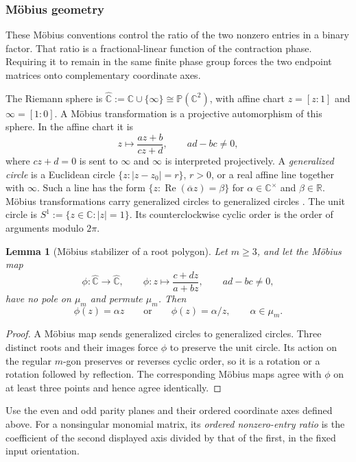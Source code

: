\documentclass[11pt,letterpaper,onecolumn]{article}
\theoremstyle{plain}
\newtheorem{lemma}[lemma]{Lemma}
\theoremstyle{definition}
\theoremstyle{remark}
\begin{document}
\subsubsection{Möbius geometry}
\label{subsubsec:mobius-geometry}

These M\"obius conventions control the
ratio of the two nonzero entries in a binary factor.  That ratio is a
fractional-linear function of the contraction phase.  Requiring it to
remain in the same finite phase group forces the two endpoint matrices
onto complementary coordinate axes.

The Riemann sphere is
\(\widehat{\mathbb C}:=\mathbb C\cup\{\infty\}\cong\mathbb P(\mathbb C^2)\),
with affine chart \(z=[z:1]\) and \(\infty=[1:0]\).  A Möbius transformation
is a projective automorphism of this sphere. In the affine chart it is
\[
 z\longmapsto\frac{az+b}{cz+d},
 \qquad ad-bc\ne0,
\]
where \(cz+d=0\) is sent to \(\infty\) and \(\infty\) is interpreted
projectively.  A \emph{generalized circle} is a Euclidean circle
\(\{z:|z-z_0|=r\}\), \(r>0\), or a real affine line together with
\(\infty\). Such a line has the form
\(\{z:\operatorname{Re}(\overline\alpha z)=\beta\}\) for
\(\alpha\in\mathbb C^\times\) and \(\beta\in\mathbb R\).
Möbius transformations carry generalized circles to
generalized circles \cite[Chapter~3]{Beardon1983}.  The unit circle is
\(S^1:=\{z\in\mathbb C:|z|=1\}\). Its counterclockwise cyclic order is the
order of arguments modulo \(2\pi\).


\begin{lemma}[M\"obius stabilizer of a root polygon]
\label{lem:nd-root-mobius}
Let \(m\ge3\), and let the M\"obius map
\[
 \phi:\widehat{\mathbb C}\longrightarrow\widehat{\mathbb C},
 \qquad
 \phi:z\longmapsto\frac{c+dz}{a+bz},
 \qquad ad-bc\ne0,
\]
have no pole on \(\mu_m\) and permute \(\mu_m\).  Then
\[
 \phi(z)=\alpha z
 \qquad\text{or}\qquad
 \phi(z)=\alpha/z,
 \qquad \alpha\in\mu_m.
\]
\end{lemma}

\begin{proof}
A M\"obius map sends generalized circles to generalized circles.  Three
distinct roots and their images force \(\phi\) to preserve the unit circle.
Its action on the regular \(m\)-gon preserves or reverses cyclic order, so it
is a rotation or a rotation followed by reflection.  The corresponding
M\"obius maps agree with \(\phi\) on at least three points and hence agree
identically.
\end{proof}

Use the even and odd parity planes and their ordered coordinate axes
defined above.  For a nonsingular
monomial matrix, its \emph{ordered nonzero-entry ratio} is the coefficient
of the second displayed axis divided by that of the first, in the fixed input
orientation.
\end{document}
